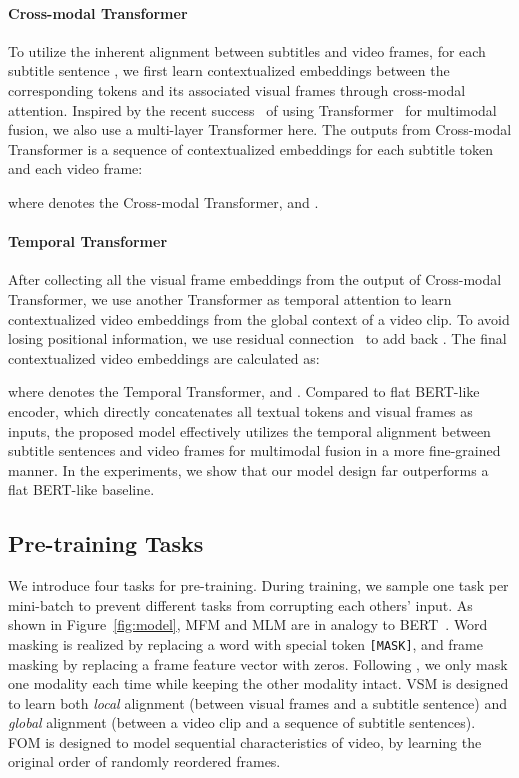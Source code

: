 \documentclass[11pt,a4paper]{article}
\begin{document}
\paragraph{Cross-modal Transformer}
To utilize the inherent alignment between subtitles and video frames, for each subtitle sentence , we first learn contextualized embeddings between the corresponding tokens  and its associated visual frames  through cross-modal attention. Inspired by the recent success~\citep{chen2019uniter,lu2019vilbert} of using Transformer~\citep{vaswani2017attention} for multimodal fusion, we also use a multi-layer Transformer here. The outputs from Cross-modal Transformer is a sequence of contextualized embeddings for each subtitle token and each video frame:

where  denotes the Cross-modal Transformer,  and . 

\paragraph{Temporal Transformer}
After collecting all the visual frame embeddings  from the output of Cross-modal Transformer, we use another Transformer as temporal attention to learn contextualized video embeddings from the global context of a video clip. To avoid losing positional information, we use residual connection~\citep{he2016deep} to add back . The final contextualized video embeddings are calculated as:

where  denotes the Temporal Transformer, and . Compared to flat BERT-like encoder, which directly concatenates all textual tokens and visual frames as inputs, the proposed model effectively utilizes the temporal alignment between subtitle sentences and video frames for multimodal fusion in a more fine-grained manner. In the experiments, we show that our model design far outperforms a flat BERT-like baseline. 

\subsection{Pre-training Tasks}\label{sec:pretraining_tasks}
We introduce four tasks for pre-training. During training, we sample one task per mini-batch to prevent different tasks from corrupting each others' input. As shown in Figure~\ref{fig:model}, MFM and MLM are in analogy to BERT~\citep{devlin2018bert}.
Word masking is realized by replacing a word with special token \texttt{[MASK]}, and frame masking by replacing a frame feature vector with zeros.
Following \citet{chen2019uniter}, we only mask one modality each time while keeping the other modality intact.
VSM is designed to learn both \emph{local} alignment (between visual frames and a subtitle sentence) and \emph{global} alignment (between a video clip and a sequence of subtitle sentences). 
FOM is designed to model sequential characteristics of video, by learning the original order of randomly reordered frames. 
\end{document}
